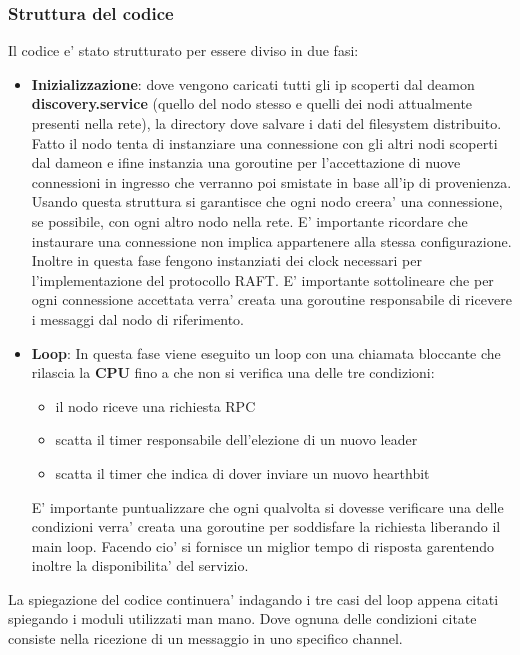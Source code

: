 \subsubsection{Struttura del codice\\}
Il codice e' stato strutturato per essere diviso in due fasi: 
\begin{itemize}
    \item \textbf{Inizializzazione}: dove vengono caricati tutti gli ip scoperti dal deamon
        \textbf{discovery.service} (quello del nodo stesso e quelli dei nodi attualmente presenti 
        nella rete), la directory dove salvare i dati del filesystem distribuito. Fatto 
        il nodo tenta di instanziare una connessione con gli altri nodi scoperti dal dameon e 
        ifine instanzia una goroutine per l'accettazione di nuove connessioni in ingresso che 
        verranno poi smistate in base all'ip di provenienza. Usando questa struttura si garantisce
        che ogni nodo creera' una connessione, se possibile, con ogni altro nodo nella rete. 
        E' importante ricordare che instaurare una connessione non implica appartenere 
        alla stessa configurazione. Inoltre in questa fase fengono instanziati
        dei clock necessari per l'implementazione del protocollo RAFT.
        E' importante sottolineare che per ogni connessione accettata verra' creata una 
        goroutine responsabile di ricevere i messaggi dal nodo di riferimento.
    \item \textbf{Loop}: In questa fase viene eseguito un loop con una chiamata bloccante che 
        rilascia la \textbf{CPU} fino a che non si verifica una delle tre condizioni:
        \begin{itemize}
            \item il nodo riceve una richiesta RPC
            \item scatta il timer responsabile dell'elezione di un nuovo leader
            \item scatta il timer che indica di dover inviare un nuovo hearthbit
        \end{itemize}
        E' importante puntualizzare che ogni qualvolta si dovesse verificare una delle condizioni
        verra' creata una goroutine per soddisfare la richiesta liberando il main loop.
        Facendo cio' si fornisce un miglior tempo di risposta garentendo inoltre la disponibilita' 
        del servizio.
\end{itemize}
La spiegazione del codice continuera' indagando i tre casi del loop appena citati spiegando i moduli 
utilizzati man mano. Dove ognuna delle condizioni citate consiste nella ricezione di un messaggio
in uno specifico channel.

